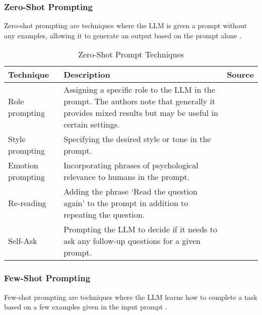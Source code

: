 \subsubsection{Zero-Shot Prompting}

Zero-shot prompting are techniques where the LLM is given a prompt without any examples, allowing it to generate an output based on the prompt alone \parencite{prompt1}.

\begin{table}[h!]
    \centering
    \begin{tabular}{p{3cm} p{8cm} p{2cm}}
        \toprule
        \textbf{Technique} & \textbf{Description} & \textbf{Source} \\
        \midrule
        \raggedright
        Role prompting & Assigning a specific role to the LLM in the prompt. The authors note that generally it provides mixed results but may be useful in certain settings.  & \textcite{role1} \\
        \hline
        \raggedright
        Style prompting & Specifying the desired style or tone in the prompt. & \textcite{style} \\
        \hline
        \raggedright
        Emotion prompting & Incorporating phrases of psychological relevance to humans in the prompt. & \textcite{emotion} \\
        \hline
        \raggedright
        Re-reading & Adding the phrase `Read the question again' to the prompt in addition to repeating the question. & \textcite{rereading} \\
        \hline
        \raggedright
        Self-Ask & Prompting the LLM to decide if it needs to ask any follow-up questions for a given prompt. &  \textcite{selfask} \\
        \bottomrule
    \end{tabular}
    \caption{Zero-Shot Prompt Techniques}\label{tab:zero_shot}
\end{table}

\FloatBarrier{}

\subsubsection{Few-Shot Prompting}

Few-shot prompting are techniques where the LLM learns how to complete a task based on a few examples given in the input prompt \parencite{prompt1}.

